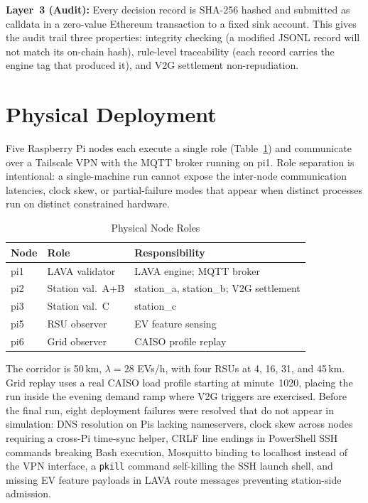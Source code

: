 \documentclass[journal,twoside,twocolumn]{IEEEtran}
\begin{document}
\textbf{Layer~3 (Audit):} Every decision record is SHA-256 hashed and submitted
as calldata in a zero-value Ethereum transaction to a fixed sink account. This
gives the audit trail three properties: integrity checking (a modified JSONL
record will not match its on-chain hash), rule-level traceability (each record
carries the engine tag that produced it), and V2G settlement non-repudiation.

\section{Physical Deployment}
\label{sec:impl}

Five Raspberry Pi nodes each execute a single role (Table~\ref{tab:nodes}) and
communicate over a Tailscale VPN with the MQTT broker running on pi1. Role
separation is intentional: a single-machine run cannot expose the inter-node
communication latencies, clock skew, or partial-failure modes that appear when
distinct processes run on distinct constrained hardware.

\begin{table}[!t]
\caption{Physical Node Roles}
\label{tab:nodes}
\centering
\footnotesize
\renewcommand{\arraystretch}{1.15}
\begin{tabular}{@{}llp{3.4cm}@{}}
\toprule
\textbf{Node} & \textbf{Role} & \textbf{Responsibility} \\
\midrule
pi1 & LAVA validator   & LAVA engine; MQTT broker \\
pi2 & Station val.\ A+B & station\_a, station\_b; V2G settlement \\
pi3 & Station val.\ C   & station\_c \\
pi5 & RSU observer      & EV feature sensing \\
pi6 & Grid observer     & CAISO profile replay \\
\bottomrule
\end{tabular}
\end{table}

The corridor is 50\,km, $\lambda = 28$ EVs/h, with four RSUs at 4, 16, 31, and
45\,km. Grid replay uses a real CAISO load profile starting at minute~1020, placing
the run inside the evening demand ramp where V2G triggers are exercised. Before
the final run, eight deployment failures were resolved that do not appear in
simulation: DNS resolution on Pis lacking nameservers, clock skew across nodes
requiring a cross-Pi time-sync helper, CRLF line endings in PowerShell SSH
commands breaking Bash execution, Mosquitto binding to localhost instead of the
VPN interface, a \texttt{pkill} command self-killing the SSH launch shell, and
missing EV feature payloads in LAVA route messages preventing station-side
admission.
\end{document}
